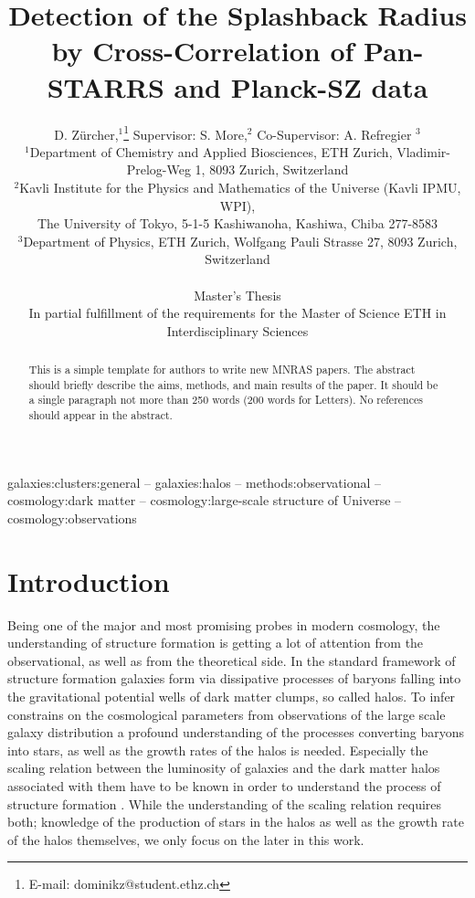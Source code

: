 \documentclass[a4paper,fleqn,usenatbib]{mnras}
\title[Splashback radius in Pan-STARRS / Planck-SZ data]{Detection of the Splashback Radius by Cross-Correlation of Pan-STARRS and Planck-SZ data}
\author[D. Zürcher]{
D. Zürcher,$^{1}$\thanks{E-mail: dominikz@student.ethz.ch}
Supervisor: S. More,$^{2}$
Co-Supervisor: A. Refregier $^{3}$
\\
$^{1}$Department of Chemistry and Applied Biosciences, ETH Zurich, Vladimir-Prelog-Weg 1, 8093 Zurich, Switzerland\\
$^{2}$Kavli Institute for the Physics and Mathematics of the Universe (Kavli IPMU, WPI), \\ The University
of Tokyo, 5-1-5 Kashiwanoha, Kashiwa, Chiba 277-8583\\
$^{3}$Department of Physics, ETH Zurich, Wolfgang Pauli Strasse 27, 8093 Zurich, Switzerland\\
\\
Master's Thesis\\
In partial fulfillment of the requirements for the Master of Science ETH in Interdisciplinary Sciences 
}
\begin{document}
\label{firstpage}
\pagerange{\pageref{firstpage}--\pageref{lastpage}}
\maketitle

\begin{abstract}
This is a simple template for authors to write new MNRAS papers.
The abstract should briefly describe the aims, methods, and main results of the paper.
It should be a single paragraph not more than 250 words (200 words for Letters).
No references should appear in the abstract.
\end{abstract}

\begin{keywords}
galaxies:clusters:general -- galaxies:halos -- methods:observational -- cosmology:dark matter -- cosmology:large-scale structure of Universe -- cosmology:observations
\end{keywords}

\section{Introduction}
Being one of the major and most promising probes in modern cosmology, the understanding of structure formation is getting a lot of attention from the observational, as well as from the theoretical side. In the standard framework of structure formation galaxies form via dissipative processes of baryons falling into the gravitational potential wells of dark matter clumps, so called halos\citep{rees1977cooling,white1978core,fall1980formation,blumenthal1984formation}. To infer constrains on the cosmological parameters from observations of the large scale galaxy distribution a profound understanding of the processes converting baryons into stars, as well as the growth rates of the halos is needed. Especially the scaling relation between the luminosity of galaxies and the dark matter halos associated with them have to be known in order to understand the process of structure formation \citep{kravtsov2004dark}. While the understanding of the scaling relation requires both; knowledge of the production of stars in the halos as well as the growth rate of the halos themselves, we only focus on the later in this work.
\end{document}

